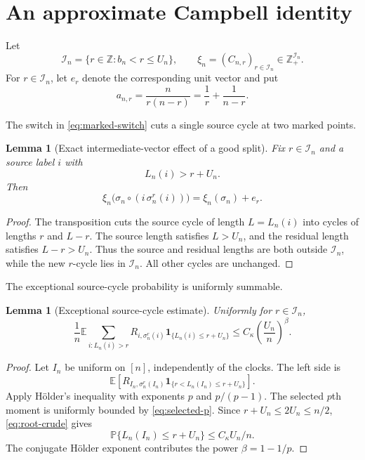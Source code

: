 \documentclass[11pt]{article}
\newtheorem{lemma}[theorem]{Lemma}
\theoremstyle{definition}
\theoremstyle{remark}
\newcommand{\Pp}{\mathbb P}
\newcommand{\Ee}{\mathbb E}
\newcommand{\one}{\mathbf 1}
\newcommand{\cI}{\mathcal I}
\newcommand{\Z}{\mathbb Z}
\begin{document}
\section{An approximate Campbell identity}

Let
\begin{equation}\label{eq:I-n}
 \cI_n=\{r\in\Z:b_n<r\le U_n\},
 \qquad
 \xi_n=(C_{n,r})_{r\in\cI_n}\in\Z_+^{\cI_n}.
\end{equation}
For $r\in\cI_n$, let $e_r$ denote the corresponding unit vector and put
\begin{equation}\label{eq:a-n-r}
 a_{n,r}=\frac{n}{r(n-r)}=\frac1r+\frac1{n-r}.
\end{equation}

The switch in \eqref{eq:marked-switch} cuts a single source cycle at two
marked points.

\begin{lemma}[Exact intermediate-vector effect of a good split]
\label{lem:good-split}
Fix $r\in\cI_n$ and a source label $i$ with
\[
 L_n(i)>r+U_n.
\]
Then
\begin{equation}\label{eq:good-split-vector}
 \xi_n\bigl(\sigma_n\circ(i\,\sigma_n^r(i))\bigr)
 =\xi_n(\sigma_n)+e_r.
\end{equation}
\end{lemma}

\begin{proof}
The transposition cuts the source cycle of length $L=L_n(i)$ into cycles of
lengths $r$ and $L-r$.  The source length satisfies $L>U_n$, and the residual
length satisfies $L-r>U_n$.  Thus the source and residual lengths are both
outside $\cI_n$, while the new $r$-cycle lies in $\cI_n$.  All other cycles
are unchanged.
\end{proof}

The exceptional source-cycle probability is uniformly summable.

\begin{lemma}[Exceptional source-cycle estimate]
\label{lem:exceptional}
Uniformly for $r\in\cI_n$,
\begin{equation}\label{eq:exceptional}
 \frac1n\Ee\sum_{i:L_n(i)>r}
 R_{i,\sigma_n^r(i)}
 \one_{\{L_n(i)\le r+U_n\}}
 \le C_\kappa\left(\frac{U_n}{n}\right)^\beta.
\end{equation}
\end{lemma}

\begin{proof}
Let $I_n$ be uniform on $[n]$, independently of the clocks.  The left side
is
\[
 \Ee\left[
 R_{I_n,\sigma_n^r(I_n)}
 \one_{\{r<L_n(I_n)\le r+U_n\}}
 \right].
\]
Apply H\"older's inequality with exponents $p$ and $p/(p-1)$.  The selected
$p$th moment is uniformly bounded by \eqref{eq:selected-p}.  Since
$r+U_n\le2U_n\le n/2$, \eqref{eq:root-crude} gives
\[
 \Pp\{L_n(I_n)\le r+U_n\}
 \le C_\kappa U_n/n.
\]
The conjugate H\"older exponent contributes the power
$\beta=1-1/p$.
\end{proof}
\end{document}
